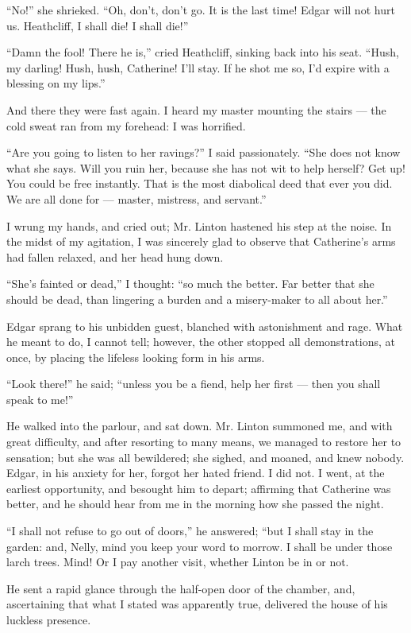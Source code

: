 \par “No!” she shrieked. “Oh, don't, don't go. It is the last time! Edgar will not hurt us. Heathcliff, I shall die! I shall die!”
\par “Damn the fool! There he is,” cried Heathcliff, sinking back into his seat. “Hush, my darling! Hush, hush, Catherine! I'll stay. If he shot me so, I'd expire with a blessing on my lips.”
\par And there they were fast again. I heard my master mounting the stairs — the cold sweat ran from my forehead: I was horrified.
\par “Are you going to listen to her ravings?” I said passionately. “She does not know what she says. Will you ruin her, because she has not wit to help herself? Get up! You could be free instantly. That is the most diabolical deed that ever you did. We are all done for — master, mistress, and servant.”
\par I wrung my hands, and cried out; Mr. Linton hastened his step at the noise. In the midst of my agitation, I was sincerely glad to observe that Catherine's arms had fallen relaxed, and her head hung down.
\par “She's fainted or dead,” I thought: “so much the better. Far better that she should be dead, than lingering a burden and a misery-maker to all about her.”
\par Edgar sprang to his unbidden guest, blanched with astonishment and rage. What he meant to do, I cannot tell; however, the other stopped all demonstrations, at once, by placing the lifeless looking form in his arms.
\par “Look there!” he said; “unless you be a fiend, help her first — then you shall speak to me!”
\par He walked into the parlour, and sat down. Mr. Linton summoned me, and with great difficulty, and after resorting to many means, we managed to restore her to sensation; but she was all bewildered; she sighed, and moaned, and knew nobody. Edgar, in his anxiety for her, forgot her hated friend. I did not. I went, at the earliest opportunity, and besought him to depart; affirming that Catherine was better, and he should hear from me in the morning how she passed the night.
\par “I shall not refuse to go out of doors,” he answered; “but I shall stay in the garden: and, Nelly, mind you keep your word to morrow. I shall be under those larch trees. Mind! Or I pay another visit, whether Linton be in or not.
\par He sent a rapid glance through the half-open door of the chamber, and, ascertaining that what I stated was apparently true, delivered the house of his luckless presence.










